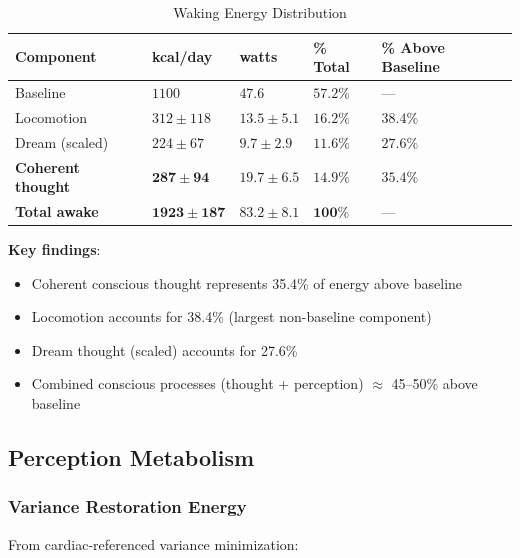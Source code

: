 \documentclass[12pt,twocolumn]{article}
\theoremstyle{remark}
\begin{document}
\begin{table}[H]
\centering
\caption{Waking Energy Distribution}
\begin{tabular}{@{}lllll@{}}
\toprule
\textbf{Component} & \textbf{kcal/day} & \textbf{watts} & \textbf{\% Total} & \textbf{\% Above Baseline} \\
\midrule
Baseline & $1100$ & $47.6$ & $57.2\%$ & --- \\
Locomotion & $312 \pm 118$ & $13.5 \pm 5.1$ & $16.2\%$ & $38.4\%$ \\
Dream (scaled) & $224 \pm 67$ & $9.7 \pm 2.9$ & $11.6\%$ & $27.6\%$ \\
\textbf{Coherent thought} & $\mathbf{287 \pm 94}$ & $\mathbf{19.7 \pm 6.5}$ & $\mathbf{14.9\%}$ & $\mathbf{35.4\%}$ \\
\midrule
\textbf{Total awake} & $\mathbf{1923 \pm 187}$ & $\mathbf{83.2 \pm 8.1}$ & $\mathbf{100\%}$ & --- \\
\bottomrule
\end{tabular}
\end{table}

\textbf{Key findings}:
\begin{itemize}
\item Coherent conscious thought represents 35.4\% of energy above baseline
\item Locomotion accounts for 38.4\% (largest non-baseline component)
\item Dream thought (scaled) accounts for 27.6\%
\item Combined conscious processes (thought + perception) $\approx$ 45--50\% above baseline
\end{itemize}

\subsection{Perception Metabolism}

\subsubsection{Variance Restoration Energy}

From cardiac-referenced variance minimization:
\end{document}
